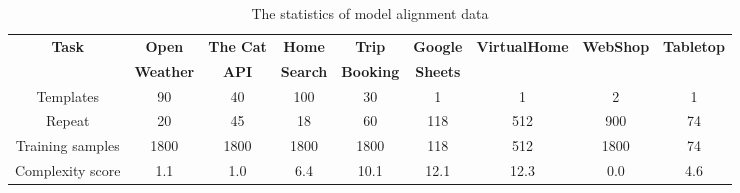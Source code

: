 \begin{table}[]
\centering
\caption{The statistics of model alignment data}
\label{tab:training_data}
\begin{adjustbox}{max width=\textwidth}
\begin{tabular}{ccccccccc}
\toprule
\multirow{2}{*}{\textbf{Task}} &
  \textbf{Open} &
  \textbf{The Cat} &
  \textbf{Home} &
  \textbf{Trip} &
  \multicolumn{1}{c}{\textbf{Google}} &
  \multicolumn{1}{c}{\multirow{2}{*}{\textbf{VirtualHome}}} &
  \multicolumn{1}{c}{\multirow{2}{*}{\textbf{WebShop}}} &
  \multicolumn{1}{c}{\multirow{2}{*}{\textbf{Tabletop}}} \\
 &
  \textbf{Weather} &
  \textbf{API} &
  \textbf{Search} &
  \textbf{Booking} &
  \multicolumn{1}{c}{\textbf{Sheets}} &
  \multicolumn{1}{c}{} &
  \multicolumn{1}{c}{} &
  \multicolumn{1}{c}{} \\
\midrule
Templates        & 90   & 40   & 100  & 30   & 1   & 1   & 2    & 1 \\
Repeat           & 20   & 45   & 18   & 60   & 118 & 512 & 900  & 74 \\
Training samples & 1800 & 1800 & 1800 & 1800 & 118 & 512 & 1800 & 74 \\
\midrule
Complexity score & 1.1 & 1.0 & 6.4 & 10.1 & 12.1 & 12.3 & 0.0 & 4.6 \\

\bottomrule
\end{tabular}
\end{adjustbox}
\end{table}
